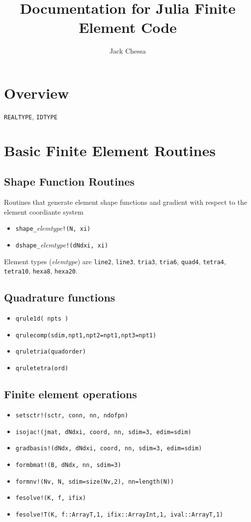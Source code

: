 \documentclass[11pt]{article} %
\title{Documentation for Julia Finite Element Code}
\author{Jack Chessa}
\begin{document}
\maketitle

\section{Overview}


\texttt{REALTYPE},  \texttt{IDTYPE}

\section{Basic Finite Element Routines}
\subsection{Shape Function Routines}
Routines that generate element shape functions and gradient with respect to the element coordiante system
\begin{itemize}
\item \texttt{shape\_}\textit{elemtype}\texttt{!(N, xi)}
\item \texttt{dshape\_}\textit{elemtype}\texttt{!(dNdxi, xi)}
\end{itemize}
Element types (\textit{elemtype}) are \texttt{line2}, \texttt{line3}, \texttt{tria3}, \texttt{tria6}, \texttt{quad4}, \texttt{tetra4},   \texttt{tetra10}, \texttt{hexa8}, \texttt{hexa20}.

\subsection{Quadrature functions}
\begin{itemize}
\item \texttt{qrule1d( npts )}
\item \texttt{qrulecomp(sdim,npt1,npt2=npt1,npt3=npt1)}
\item \texttt{qruletria(quadorder)}
\item \texttt{qruletetra(ord)}
\end{itemize}

\subsection{Finite element operations}
\begin{itemize}
\item \texttt{setsctr!(sctr, conn, nn, ndofpn)}
\item \texttt{isojac!(jmat, dNdxi, coord, nn, sdim=3, edim=sdim)}
\item \texttt{gradbasis!(dNdx, dNdxi, coord, nn, sdim=3, edim=sdim)}
\item \texttt{formbmat!(B, dNdx, nn, sdim=3)}
\item \texttt{formnv!(Nv, N, sdim=size(Nv,2), nn=length(N))}
\item \texttt{fesolve!(K, f, ifix)}
\item \texttt{fesolve!{T}(K, f::Array{T,1}, ifix::Array{Int,1}, ival::Array{T,1})}
\end{itemize}
\end{document}

